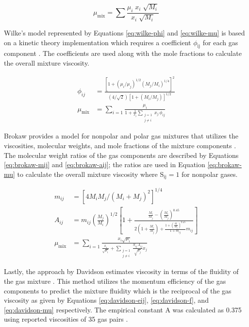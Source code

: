 \documentclass{article}
\begin{document}
\begin{equation}
    \mu_\text{mix} = \sum \frac{\mu_i \; x_i \; \sqrt{M_i}}{x_i \; \sqrt{M_i}}
    \label{eq:herning}
\end{equation}

\noindent Wilke's model represented by Equations \ref{eq:wilke-phi} and \ref{eq:wilke-mu} is based on a kinetic theory implementation which requires a coefficient $\phi_\text{ij}$ for each gas component \cite{Wilke-1950}. The coefficients are used along with the mole fractions to calculate the overall mixture viscosity.

\begin{align}
    \phi_{ij} &= \frac{\left[1 + (\mu_i/\mu_j)^{1/2} (M_j/M_i)^{1/4}\right]^2}{(4/\sqrt{2}) \left[1 + (M_i/M_j)\right]^{1/2}} \label{eq:wilke-phi} \\
    \mu_{\text{mix}} &= \sum_{i=1} \frac{\mu_i}{1 + \frac{1}{x_i} \sum_{\substack{j=1 \\j \neq i}} x_j \, \phi_{ij}} \label{eq:wilke-mu}
\end{align}

\noindent Brokaw provides a model for nonpolar and polar gas mixtures that utilizes the viscosities, molecular weights, and mole fractions of the mixture components \cite{Brokaw-1968}. The molecular weight ratios of the gas components are described by Equations \ref{eq:brokaw-mij} and \ref{eq:brokaw-aij}; the ratios are used in Equation \ref{eq:brokaw-mu} to calculate the overall mixture viscosity where S$_\text{ij} = 1$ for nonpolar gases.

\begin{align}
    m_{ij} &= \left[ 4 M_i M_j / (M_i + M_j)^2 \right]^{1/4} \label{eq:brokaw-mij} \\
    A_{ij} &= m_{ij}\left( \frac{M_j}{M_i} \right)^{1/2} \left[ 1 + \frac{\frac{M_i}{M_j} - \left(\frac{M_i}{M_j} \right)^{0.45} }{ 2 \left(1 + \frac{M_i}{M_j} \right) + \frac{1 + \left(\frac{M_i}{M_j} \right)^{0.45}}{1 + m_{ij}} m_{ij}} \right] \label{eq:brokaw-aij} \\
    \mu_{\text{mix}} &= \sum_{i=1} \frac{x_i \sqrt{\mu_i}}{\frac{x_i}{\sqrt{\mu_i}} + \sum_{\substack{j=1 \\ j \neq i}} \frac{S_{ij} \, A_{ij}}{\sqrt{\mu_j}} x_j} \label{eq:brokaw-mu}
\end{align}

\noindent Lastly, the approach by Davidson estimates viscosity in terms of the fluidity of the gas mixture \cite{Davidson-1993}. This method utilizes the momentum efficiency of the gas components to predict the mixture fluidity which is the reciprocal of the gas viscosity as given by Equations \ref{eq:davidson-eij}, \ref{eq:davidson-f}, and \ref{eq:davidson-mu} respectively. The empirical constant A was calculated as 0.375 using reported viscosities of 35 gas pairs \cite{Davidson-1993}.
\end{document}
